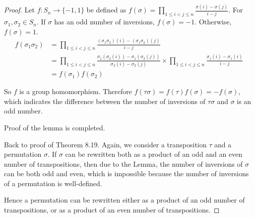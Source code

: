 \begin{proof}
    Let $f: S_{n}\to \{ -1, 1 \}$ be defined as $f(\sigma) = \prod_{1\leq i < j\leq n}\frac{\sigma(i) - \sigma(j)}{i - j}$. For $\sigma_{1}, \sigma_{2}\in S_{n}$. If $\sigma$ has an odd number of inversions, $f(\sigma) = -1$. Otherwise, $f(\sigma) = 1$.
    \begin{align*}
        f(\sigma_{1}\sigma_{2}) & = \prod_{1\leq i < j \leq n}\frac{(\sigma_{1}\sigma_{2})(i) - (\sigma_{1}\sigma_{2})(j)}{i - j}                                                                                                      \\
                                & = \prod_{1\leq i < j \leq n}\frac{\sigma_{1}(\sigma_{2}(i)) - \sigma_{1}(\sigma_{2}(j))}{\sigma_{2}(i) - \sigma_{2}(j)} \times \prod_{1\leq i < j\leq n} \frac{\sigma_{1}(i) - \sigma_{1}(i)}{i - j} \\
                                & = f(\sigma_{1})f(\sigma_{2})
    \end{align*}

    So $f$ is a group homomorphism. Therefore $f(\tau\sigma) = f(\tau)f(\sigma) = -f(\sigma)$, which indicates the difference between the number of inversions of $\tau\sigma$ and $\sigma$ is an odd number.

    Proof of the lemma is completed.
    \bigskip

    Back to proof of Theorem 8.19. Again, we consider a transposition $\tau$ and a permutation $\sigma$. If $\sigma$ can be rewritten both as a product of an odd and an even number of transpositions, then due to the Lemma, the number of inversions of $\sigma$ can be both odd and even, which is impossible because the number of inversions of a permutation is well-defined.

    Hence a permutation can be rewritten either as a product of an odd number of transpositions, or as a product of an even number of transpositions.
\end{proof}

